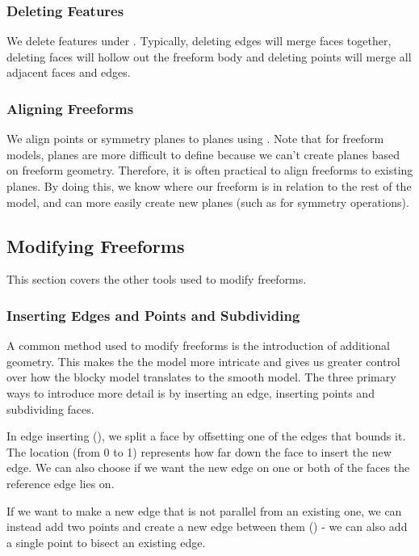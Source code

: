 \subsubsection{Deleting Features}
We delete features under . Typically, deleting edges will merge faces together, deleting faces will hollow out the freeform body and deleting points will merge all adjacent faces and edges.

\subsubsection{Aligning Freeforms}
We align points or symmetry planes to planes using . Note that for freeform models, planes are more difficult to define because we can't create planes based on freeform geometry. Therefore, it is often practical to align freeforms to existing planes. By doing this, we know where our freeform is in relation to the rest of the model, and can more easily create new planes (such as for symmetry operations).

\subsection{Modifying Freeforms}

This section covers the other tools used to modify freeforms.

\subsubsection{Inserting Edges and Points and Subdividing}

A common method used to modify freeforms is the introduction of additional geometry. This makes the the model more intricate and gives us greater control over how the blocky model translates to the smooth model. The three primary ways to introduce more detail is by inserting an edge, inserting points and subdividing faces.

In edge inserting (), we split a face by offsetting one of the edges that bounds it. The location (from 0 to 1) represents how far down the face to insert the new edge. We can also choose if we want the new edge on one or both of the faces the reference edge lies on. 

If we want to make a new edge that is not parallel from an existing one, we can instead add two points and create a new edge between them () - we can also add a single point to bisect an existing edge. 

